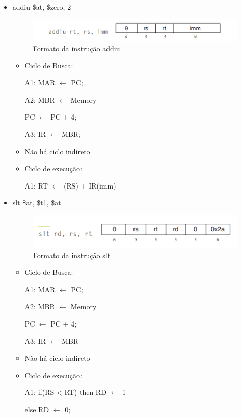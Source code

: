 \documentclass[
	12pt,				%
	oneside,			%
	a4paper,			%
	english,			%
	brazil				%
	]{abntex2ppgsi}
\begin{document}
\begin{itemize}
    \item addiu \$at, \$zero, 2
    \begin{figure}[h] \centering \includegraphics{411.png} \caption{Formato da instrução addiu} \label{fig411} \end{figure}
    \begin{itemize}
        \item Ciclo de Busca:

            A1: MAR $\leftarrow$ PC;

            A2: MBR $\leftarrow$ Memory

            PC $\leftarrow$ PC + 4;

            A3: IR $\leftarrow$ MBR;
        \item Não há ciclo indireto
        \item Ciclo de execução:

            A1: RT $\leftarrow$ (RS) + IR(imm)
    \end{itemize}
    \item slt \$at, \$t1, \$at
    \begin{figure}[h]
        \centering
        \includegraphics{412.png}
        \caption{Formato da instrução slt}
        \label{fig412}
    \end{figure}
    \begin{itemize}
        \item Ciclo de Busca:

            A1: MAR $\leftarrow$ PC;

            A2: MBR $\leftarrow$ Memory

            PC $\leftarrow$ PC + 4;

            A3: IR $\leftarrow$ MBR

        \item Não há ciclo indireto
        \item Ciclo de execução:

            A1: if(RS < RT) then RD $\leftarrow$ 1

            else RD $\leftarrow$ 0;
    \end{itemize}


\end{itemize}
\end{document}
